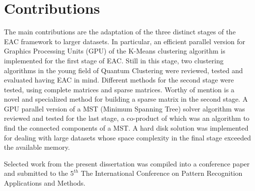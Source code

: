 \section{Contributions}
The main contributions are the adaptation of the three distinct stages of the EAC framework to larger datasets.
In particular, an efficient parallel version for Graphics Processing Units (GPU) of the K-Means clustering algorithm is implemented for the first stage of EAC.
Still in this stage, two clustering algorithms in the young field of Quantum Clustering were reviewed, tested and evaluated having EAC in mind. %
Different methods for the second stage were tested, using complete matrices and sparse matrices.%
Worthy of mention is a novel and specialized method for building a sparse matrix in the second stage. %
A GPU parallel version of a MST (Minimum Spanning Tree) solver algorithm was reviewed and tested for the last stage, a co-product of which was an algorithm to find the connected components of a MST.
A hard disk solution was implemented for dealing with large datasets whose space complexity in the final stage exceeded the available memory.

Selected work from the present dissertation was compiled into a conference paper and submitted to the $5^{th}$ The International Conference on Pattern Recognition Applications and Methods.





